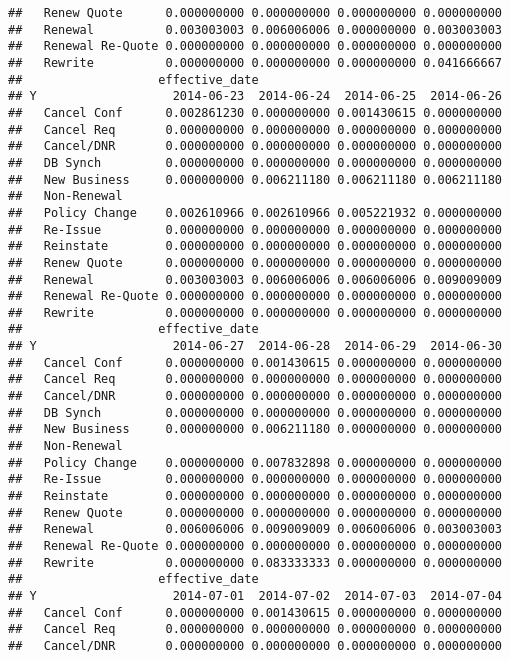 \documentclass[]{article}
\begin{document}
\begin{verbatim}
##   Renew Quote      0.000000000 0.000000000 0.000000000 0.000000000
##   Renewal          0.003003003 0.006006006 0.000000000 0.003003003
##   Renewal Re-Quote 0.000000000 0.000000000 0.000000000 0.000000000
##   Rewrite          0.000000000 0.000000000 0.000000000 0.041666667
##                   effective_date
## Y                   2014-06-23  2014-06-24  2014-06-25  2014-06-26
##   Cancel Conf      0.002861230 0.000000000 0.001430615 0.000000000
##   Cancel Req       0.000000000 0.000000000 0.000000000 0.000000000
##   Cancel/DNR       0.000000000 0.000000000 0.000000000 0.000000000
##   DB Synch         0.000000000 0.000000000 0.000000000 0.000000000
##   New Business     0.000000000 0.006211180 0.006211180 0.006211180
##   Non-Renewal                                                     
##   Policy Change    0.002610966 0.002610966 0.005221932 0.000000000
##   Re-Issue         0.000000000 0.000000000 0.000000000 0.000000000
##   Reinstate        0.000000000 0.000000000 0.000000000 0.000000000
##   Renew Quote      0.000000000 0.000000000 0.000000000 0.000000000
##   Renewal          0.003003003 0.006006006 0.006006006 0.009009009
##   Renewal Re-Quote 0.000000000 0.000000000 0.000000000 0.000000000
##   Rewrite          0.000000000 0.000000000 0.000000000 0.000000000
##                   effective_date
## Y                   2014-06-27  2014-06-28  2014-06-29  2014-06-30
##   Cancel Conf      0.000000000 0.001430615 0.000000000 0.000000000
##   Cancel Req       0.000000000 0.000000000 0.000000000 0.000000000
##   Cancel/DNR       0.000000000 0.000000000 0.000000000 0.000000000
##   DB Synch         0.000000000 0.000000000 0.000000000 0.000000000
##   New Business     0.000000000 0.006211180 0.000000000 0.000000000
##   Non-Renewal                                                     
##   Policy Change    0.000000000 0.007832898 0.000000000 0.000000000
##   Re-Issue         0.000000000 0.000000000 0.000000000 0.000000000
##   Reinstate        0.000000000 0.000000000 0.000000000 0.000000000
##   Renew Quote      0.000000000 0.000000000 0.000000000 0.000000000
##   Renewal          0.006006006 0.009009009 0.006006006 0.003003003
##   Renewal Re-Quote 0.000000000 0.000000000 0.000000000 0.000000000
##   Rewrite          0.000000000 0.083333333 0.000000000 0.000000000
##                   effective_date
## Y                   2014-07-01  2014-07-02  2014-07-03  2014-07-04
##   Cancel Conf      0.000000000 0.001430615 0.000000000 0.000000000
##   Cancel Req       0.000000000 0.000000000 0.000000000 0.000000000
##   Cancel/DNR       0.000000000 0.000000000 0.000000000 0.000000000

\end{verbatim}
\end{document}
